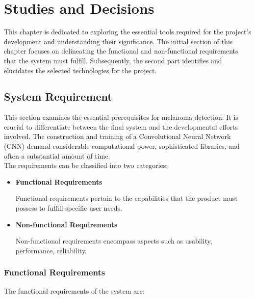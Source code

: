 \chapter{Studies and Decisions} \label{cap:studies_and_decisions}

This chapter is dedicated to exploring the essential tools required for the
project's development and understanding their significance. The initial section
of this chapter focuses on delineating the functional and non-functional
requirements that the system must fulfill. Subsequently, the second part
identifies and elucidates the selected technologies for the project.

\section{System Requirement}

This section examines the essential prerequisites for melanoma detection. It is
crucial to differentiate between the final system and the developmental efforts
involved. The construction and training of a Convolutional Neural Network (CNN)
demand considerable computational power, sophisticated libraries, and often a
substantial amount of time.  \\

The requirements can be classified into two categories:

\begin{itemize}
  \item \textbf{Functional Requirements}

    Functional requirements pertain to the capabilities that the product must
    possess to fulfill specific user needs.

  \item \textbf{Non-functional Requirements}

    Non-functional requirements encompass aspects such as usability, performance,
    reliability.

\end{itemize}

\newpage

\subsection{Functional Requirements}

The functional requirements of the system are:

